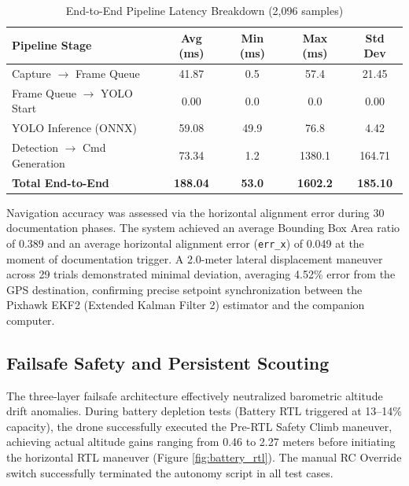 \documentclass[conference]{IEEEtran}
\begin{document}
\begin{table}[ht]
    \centering
    \caption{End-to-End Pipeline Latency Breakdown (2,096 samples)}
    \label{tab:latency_breakdown}
    \setlength{\tabcolsep}{3pt}
    \begin{tabular}{@{}p{3.0cm}cccc@{}}
        \toprule
        \textbf{Pipeline Stage} & \textbf{Avg (ms)} & \textbf{Min (ms)} & \textbf{Max (ms)} & \textbf{Std Dev} \\
        \midrule
        Capture $\rightarrow$ Frame Queue & 41.87 & 0.5 & 57.4 & 21.45 \\
        Frame Queue $\rightarrow$ YOLO Start & 0.00 & 0.0 & 0.0 & 0.00 \\
        YOLO Inference (ONNX) & 59.08 & 49.9 & 76.8 & 4.42 \\
        Detection $\rightarrow$ Cmd Generation & 73.34 & 1.2 & 1380.1 & 164.71 \\
        \midrule
        \textbf{Total End-to-End} & \textbf{188.04} & \textbf{53.0} & \textbf{1602.2} & \textbf{185.10} \\
        \bottomrule
    \end{tabular}
\end{table}

Navigation accuracy was assessed via the horizontal alignment error during 30 documentation phases. The system achieved an average Bounding Box Area ratio of 0.389 and an average horizontal alignment error (\texttt{err\_x}) of 0.049 at the moment of documentation trigger. A 2.0-meter lateral displacement maneuver across 29 trials demonstrated minimal deviation, averaging 4.52\% error from the GPS destination, confirming precise setpoint synchronization between the Pixhawk EKF2 (Extended Kalman Filter 2) estimator and the companion computer.

\subsection{Failsafe Safety and Persistent Scouting}
\label{sec:results_failsafe}
The three-layer failsafe architecture effectively neutralized barometric altitude drift anomalies. During battery depletion tests (Battery RTL triggered at 13--14\% capacity), the drone successfully executed the Pre-RTL Safety Climb maneuver, achieving actual altitude gains ranging from 0.46 to 2.27 meters before initiating the horizontal RTL maneuver (Figure \ref{fig:battery_rtl}). The manual RC Override switch successfully terminated the autonomy script in all test cases.
\end{document}
